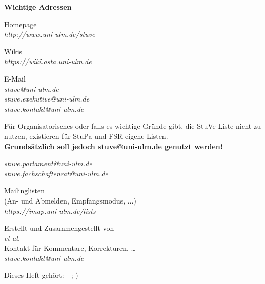 %
%


\newpage
\thispagestyle{empty}

\bigskip

\begin{center}

\null
\vspace{2em}
\textbf{Wichtige Adressen}

\bigskip
Homepage\\
\textit{http://www.uni-ulm.de/stuve}

\bigskip
Wikis\\
\textit{https://wiki.asta.uni-ulm.de}

\bigskip
E-Mail\\
\textit{stuve@uni-ulm.de\\
stuve.exekutive@uni-ulm.de\\
stuve.kontakt@uni-ulm.de}\\

\null
\begin{minipage}{0.5\textwidth}
	\scriptsize
	\begin{center}
	Für Organisatorisches oder falls es wichtige Gründe gibt, die StuVe-Liste nicht zu nutzen, existieren für StuPa und FSR eigene Listen. \\\textbf{Grundsätzlich soll jedoch stuve@uni-ulm.de genutzt werden!}
	\end{center}
\end{minipage}

\null
\textit{stuve.parlament@uni-ulm.de\\
stuve.fachschaftenrat@uni-ulm.de}

\bigskip
Mailinglisten\\
{\scriptsize (An- und Abmelden, Empfangsmodus, ...)}\\
\textit{https://imap.uni-ulm.de/lists}

\null
\vfill
Erstellt und Zusammengestellt von\\
\textit{et al.}\\
\null
Kontakt für Kommentare, Korrekturen, …\\
\textit{stuve.kontakt@uni-ulm.de}
\null
\vfill
\begin{minipage}{0.8\textwidth}
Dieses Heft gehört:~\hrulefill~;-)
\end{minipage}
\vspace{2em}
\null

\end{center}

\clearpage
